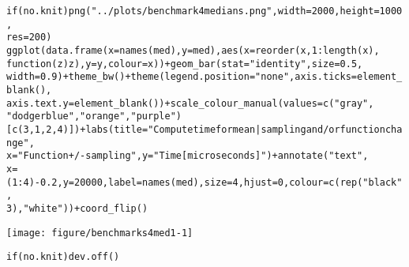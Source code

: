 \documentclass{article}\usepackage[]{graphicx}\usepackage[]{color}
\makeatletter
\def\maxwidth{ %
  \ifdim\Gin@nat@width>\linewidth
    \linewidth
  \else
    \Gin@nat@width
  \fi
}
\newcommand{\hlnum}[1]{\textcolor[rgb]{0.863,0.196,0.184}{#1}}%
\newcommand{\hlstr}[1]{\textcolor[rgb]{0.863,0.196,0.184}{#1}}%
\newcommand{\hlopt}[1]{\textcolor[rgb]{0.576,0.631,0.631}{#1}}%
\newcommand{\hlstd}[1]{\textcolor[rgb]{0.514,0.58,0.588}{#1}}%
\newcommand{\hlkwa}[1]{\textcolor[rgb]{0.796,0.294,0.086}{#1}}%
\newcommand{\hlkwc}[1]{\textcolor[rgb]{0.796,0.294,0.086}{#1}}%
\newcommand{\hlkwd}[1]{\textcolor[rgb]{0.576,0.631,0.631}{#1}}%
\newenvironment{kframe}{%
 \def\at@end@of@kframe{}%
 \ifinner\ifhmode%
  \def\at@end@of@kframe{\end{minipage}}%
  \begin{minipage}{\columnwidth}%
 \fi\fi%
 \def\FrameCommand##1{\hskip\@totalleftmargin \hskip-\fboxsep
 \colorbox{shadecolor}{##1}\hskip-\fboxsep
     \hskip-\linewidth \hskip-\@totalleftmargin \hskip\columnwidth}%
 \MakeFramed {\advance\hsize-\width
   \@totalleftmargin\z@ \linewidth\hsize
   \@setminipage}}%
 {\par\unskip\endMakeFramed%
 \at@end@of@kframe}
\newenvironment{knitrout}{}{} %
\makeatother
\begin{document}
\begin{knitrout}
\color{fgcolor}\begin{kframe}
\begin{alltt}
\hlkwa{if} \hlstd{(no.knit)} \hlkwd{png}\hlstd{(}\hlstr{"../plots/benchmark4medians.png"}\hlstd{,} \hlkwc{width} \hlstd{=} \hlnum{2000}\hlstd{,} \hlkwc{height} \hlstd{=} \hlnum{1000}\hlstd{,}
    \hlkwc{res} \hlstd{=} \hlnum{200}\hlstd{)}
\hlkwd{ggplot}\hlstd{(}\hlkwd{data.frame}\hlstd{(}\hlkwc{x} \hlstd{=} \hlkwd{names}\hlstd{(med),} \hlkwc{y} \hlstd{= med),} \hlkwd{aes}\hlstd{(}\hlkwc{x} \hlstd{=} \hlkwd{reorder}\hlstd{(x,} \hlnum{1}\hlopt{:}\hlkwd{length}\hlstd{(x),}
    \hlkwa{function}\hlstd{(}\hlkwc{z}\hlstd{) z),} \hlkwc{y} \hlstd{= y,} \hlkwc{colour} \hlstd{= x))} \hlopt{+} \hlkwd{geom_bar}\hlstd{(}\hlkwc{stat} \hlstd{=} \hlstr{"identity"}\hlstd{,} \hlkwc{size} \hlstd{=} \hlnum{0.5}\hlstd{,}
    \hlkwc{width} \hlstd{=} \hlnum{0.9}\hlstd{)} \hlopt{+} \hlkwd{theme_bw}\hlstd{()} \hlopt{+} \hlkwd{theme}\hlstd{(}\hlkwc{legend.position} \hlstd{=} \hlstr{"none"}\hlstd{,} \hlkwc{axis.ticks} \hlstd{=} \hlkwd{element_blank}\hlstd{(),}
    \hlkwc{axis.text.y} \hlstd{=} \hlkwd{element_blank}\hlstd{())} \hlopt{+} \hlkwd{scale_colour_manual}\hlstd{(}\hlkwc{values} \hlstd{=} \hlkwd{c}\hlstd{(}\hlstr{"gray"}\hlstd{,}
    \hlstr{"dodgerblue"}\hlstd{,} \hlstr{"orange"}\hlstd{,} \hlstr{"purple"}\hlstd{)[}\hlkwd{c}\hlstd{(}\hlnum{3}\hlstd{,} \hlnum{1}\hlstd{,} \hlnum{2}\hlstd{,} \hlnum{4}\hlstd{)])} \hlopt{+} \hlkwd{labs}\hlstd{(}\hlkwc{title} \hlstd{=} \hlstr{"Compute time for mean | sampling and/or function change"}\hlstd{,}
    \hlkwc{x} \hlstd{=} \hlstr{"Function +/- sampling"}\hlstd{,} \hlkwc{y} \hlstd{=} \hlstr{"Time [microseconds]"}\hlstd{)} \hlopt{+} \hlkwd{annotate}\hlstd{(}\hlstr{"text"}\hlstd{,}
    \hlkwc{x} \hlstd{= (}\hlnum{1}\hlopt{:}\hlnum{4}\hlstd{)} \hlopt{-} \hlnum{0.2}\hlstd{,} \hlkwc{y} \hlstd{=} \hlnum{20000}\hlstd{,} \hlkwc{label} \hlstd{=} \hlkwd{names}\hlstd{(med),} \hlkwc{size} \hlstd{=} \hlnum{4}\hlstd{,} \hlkwc{hjust} \hlstd{=} \hlnum{0}\hlstd{,} \hlkwc{colour} \hlstd{=} \hlkwd{c}\hlstd{(}\hlkwd{rep}\hlstd{(}\hlstr{"black"}\hlstd{,}
        \hlnum{3}\hlstd{),} \hlstr{"white"}\hlstd{))} \hlopt{+} \hlkwd{coord_flip}\hlstd{()}
\end{alltt}
\end{kframe}
\texttt{[image: figure/benchmarks4med1-1]} 
\begin{kframe}\begin{alltt}
\hlkwa{if} \hlstd{(no.knit)} \hlkwd{dev.off}\hlstd{()}
\end{alltt}
\end{kframe}
\end{knitrout}
\end{document}
